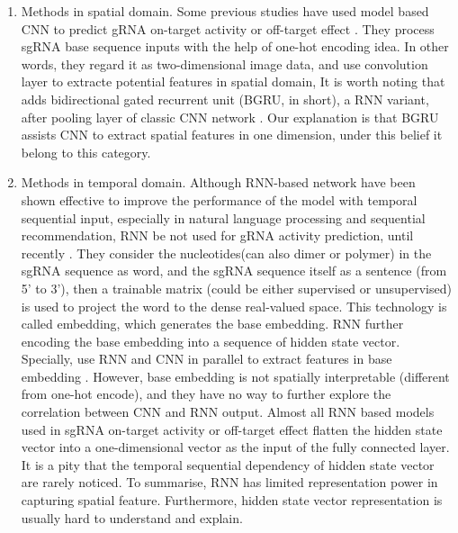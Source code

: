 \documentclass{bioinfo}
\begin{document}
\begin{enumerate}
    \item Methods in spatial domain. 
    Some previous studies have used model based CNN to predict gRNA on-target activity or off-target effect \citep{lin2018off-target,kim2018deep,chuai2018deepcrispr}. 
    They process sgRNA base sequence inputs with the help of one-hot encoding idea. 
    In other words, they regard it as two-dimensional image data, and use convolution layer to extracte potential features in spatial domain, 
    It is worth noting that \citeauthor{zhang2020c-rnncrispr:} adds bidirectional gated recurrent unit (BGRU, in short), a RNN variant, after pooling layer of classic CNN network \citep{zhang2020c-rnncrispr:}. 
    Our explanation is that BGRU assists CNN to extract spatial features in one dimension, under this belief it belong to this category. 
    \item Methods in temporal domain. 
    Although RNN-based network have been shown effective to improve the performance of the model with temporal sequential input, especially in natural language processing and sequential recommendation, 
    RNN be not used for gRNA activity prediction, until recently \citep{wang2019optimized,liu2020deep,Liu2019}. 
    They consider the nucleotides(can also dimer or polymer) in the sgRNA sequence as word, and the sgRNA sequence itself as a sentence (from 5' to 3'), then a trainable matrix (could be either supervised or unsupervised) is used to project the word to the dense real-valued space. 
    This technology is called embedding, which generates the base embedding. RNN further encoding the base embedding into a sequence of hidden state vector. 
    Specially, \citeauthor{Liu2019} use RNN and CNN in parallel to extract features in base embedding \citep{Liu2019}. 
    However, base embedding is not spatially interpretable (different from one-hot encode), and they have no way to further explore the correlation between CNN and RNN output. 
    Almost all RNN based models used in sgRNA on-target activity or off-target effect flatten the hidden state vector into a one-dimensional vector as the input of the fully connected layer. 
    It is a pity that the temporal sequential dependency of hidden state vector are rarely noticed. 
    To summarise, RNN has limited representation power in capturing spatial feature. Furthermore, hidden state vector representation is usually hard to understand and explain.
\end{enumerate}
\end{document}
